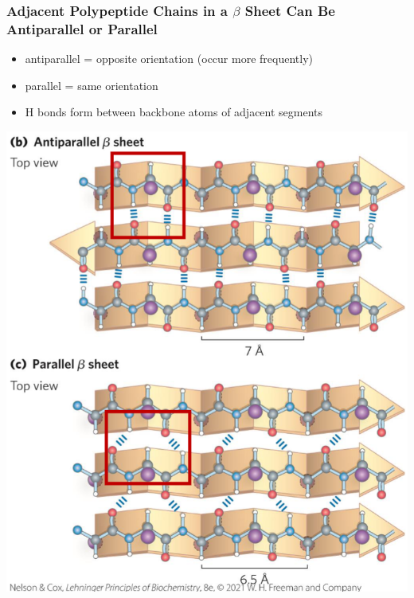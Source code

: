\documentclass[10pt]{article}
\begin{document}
\subsubsection*{Adjacent Polypeptide Chains in a $\beta$ Sheet Can Be Antiparallel or Parallel}
\begin{itemize}
    \item antiparallel = opposite orientation  (occur more frequently)
    \item parallel = same orientation
    \item H bonds form between backbone atoms of adjacent segments
\end{itemize}
\begin{center}
    \includegraphics*[scale=0.7]{L4_3.png}
\end{center}
\end{document}
